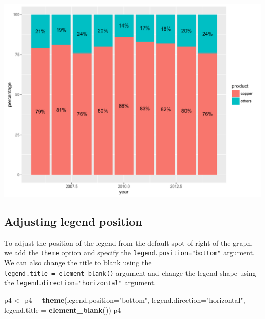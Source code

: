\documentclass[]{article}
\newenvironment{Shaded}{\begin{snugshade}}{\end{snugshade}}
\newcommand{\KeywordTok}[1]{\textcolor[rgb]{0.13,0.29,0.53}{\textbf{{#1}}}}
\newcommand{\DataTypeTok}[1]{\textcolor[rgb]{0.13,0.29,0.53}{{#1}}}
\newcommand{\StringTok}[1]{\textcolor[rgb]{0.31,0.60,0.02}{{#1}}}
\newcommand{\NormalTok}[1]{{#1}}
\begin{document}
\begin{center}\includegraphics{0_all_posts_pdf/stacked_3-1} \end{center}

\subsection{Adjusting legend
position}\label{adjusting-legend-position-2}

To adjust the position of the legend from the default spot of right of
the graph, we add the \texttt{theme} option and specify the
\texttt{legend.position="bottom"} argument. We can also change the title
to blank using the \texttt{legend.title\ =\ element\_blank()} argument
and change the legend shape using the
\texttt{legend.direction="horizontal"} argument.

\begin{Shaded}
\begin{Highlighting}[]
\NormalTok{p4 <-}\StringTok{ }\NormalTok{p4 +}\StringTok{ }\KeywordTok{theme}\NormalTok{(}\DataTypeTok{legend.position=}\StringTok{"bottom"}\NormalTok{, }\DataTypeTok{legend.direction=}\StringTok{"horizontal"}\NormalTok{, }
                 \DataTypeTok{legend.title =} \KeywordTok{element_blank}\NormalTok{())}
\NormalTok{p4}
\end{Highlighting}
\end{Shaded}
\end{document}
